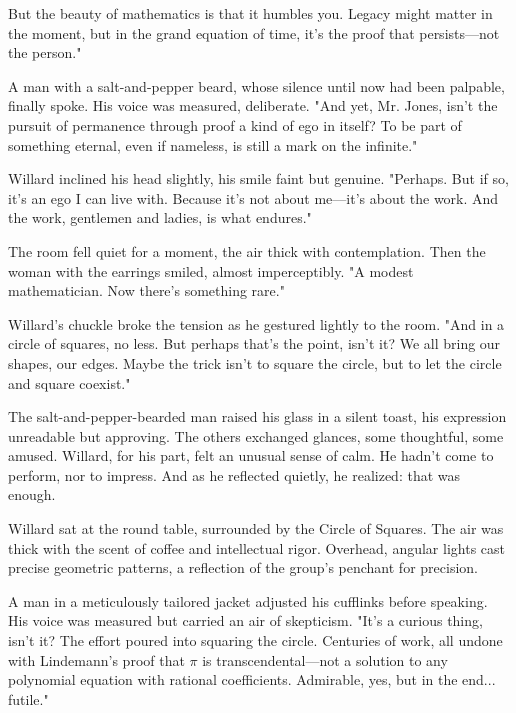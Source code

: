 \smallskip 

But the beauty of mathematics is that it humbles you. Legacy might matter in the moment, but in the grand equation of time, it’s the proof that persists—not the person."

\smallskip 

A man with a salt-and-pepper beard, whose silence until now had been palpable, finally spoke. His voice was measured, deliberate.  
"And yet, Mr. Jones, isn’t the pursuit of permanence through proof a kind of ego in itself? To be part of something eternal, even if nameless, is still a mark on the infinite."

\smallskip

Willard inclined his head slightly, his smile faint but genuine.  
"Perhaps. But if so, it’s an ego I can live with. Because it’s not about me—it’s about the work. And the work, gentlemen and ladies, is what endures."

\smallskip

The room fell quiet for a moment, the air thick with contemplation. Then the woman with the earrings smiled, almost imperceptibly.  
"A modest mathematician. Now there’s something rare."

\smallskip

Willard’s chuckle broke the tension as he gestured lightly to the room.  
"And in a circle of squares, no less. But perhaps that’s the point, isn’t it? We all bring our shapes, our edges. Maybe the trick isn’t to square the circle, but to let the circle and square coexist."

\smallskip

The salt-and-pepper-bearded man raised his glass in a silent toast, his expression unreadable but approving. The others exchanged glances, some thoughtful, some amused. Willard, for his part, felt an unusual sense of calm. He hadn’t come to perform, nor to impress. And as he reflected quietly, he realized: that was enough.

\smallskip

Willard sat at the round table, surrounded by the Circle of Squares. The air was thick with the scent of coffee and intellectual rigor. Overhead, angular lights cast precise geometric patterns, a reflection of the group’s penchant for precision.

\smallskip

A man in a meticulously tailored jacket adjusted his cufflinks before speaking. His voice was measured but carried an air of skepticism.  
"It’s a curious thing, isn’t it? The effort poured into squaring the circle. Centuries of work, all undone with Lindemann’s proof that \(\pi\) is transcendental—not a solution to any polynomial equation with rational coefficients. Admirable, yes, but in the end... futile."

